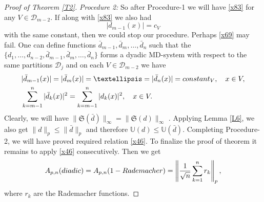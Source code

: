 \documentclass[12pt,reqno,fleqn]{amsart}
\theoremstyle{definition}
\theoremstyle{definition}
\theoremstyle{remark}
\def\constant{{\rm constant}}
\def\ZU{\ensuremath{\mathbb U}}
\def\ZS{\ensuremath{\mathfrak S}}
\def\ZD{\ensuremath{\mathscr  D}}
\numberwithin{equation}{section}
\newcommand {\e }[1]{\eqref{#1}}
\newcommand {\lem }[1]{Lemma \ref{#1}}
\newcommand {\trm }[1]{Theorem \ref{#1}}
\begin{document}
\begin{proof}[Proof of \trm{T2}]
{\it Procedure 2: } So after Procedure-1 we will have \e{x83} for any $V\in \ZD_{m-2}$. If along with \e{x83} we also had  
\begin{equation}\label{x69}
	|d_{m-1}(x)|=c_V
\end{equation}
with the same constant, then we could stop our procedure. Perhaps \e{x69} may fail. One can define functions $\bar d_{m-1}, \bar d_m,\ldots, \bar d_n$ such that the $\{d_1,\ldots, d_{n-2},\bar d_{m-1}, \bar d_m,\ldots, \bar d_n\}$ forms a dyadic MD-system with respect to the same partitions $\ZD_j$ and on each $V\in \ZD_{m-2}$ we have
\begin{align}
&|\bar d_{m-1}(x)|= |\bar d_m(x)|=\ldots= |\bar d_n(x)|=\constant_V,\quad x\in V,\\
&\sum_{k=m-1}^n|\bar d_k(x)|^2=\sum_{k=m-1}^n| d_k(x)|^2,\quad x\in V.
\end{align}
Clearly, we will have $\|\ZS(\bar d)\|_\infty= \|\ZS(d)\|_\infty$ . Applying \lem{L6}, we also get $\|d\|_p\le \|\bar d\|_p$ and therefore $\ZU(d)\le \ZU(\bar d)$. Completing Procedure-2, we will have proved required relation \e{x46}. 
To finalize the proof of theorem it remains to apply \e{x46} consecutively. Then we get 
\begin{equation}
	A_{p,n}({\rm diadic})=A_{p,n}(1-{\rm Rademacher})=\left\|\frac{1}{\sqrt n}\sum_{k=1}^nr_k\right\|_p,
\end{equation}
where $r_k$ are the Rademacher functions.
\end{proof}
\end{document}
